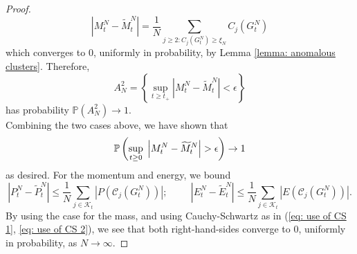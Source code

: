 \begin{proof}
\begin{equation}
          \left|M^N_t-\widetilde{M}^N_t\right|=\frac{1}{N}\sum_{j\ge 2: C_j(G^N_t)\ge \xi_N} C_j(G^N_t)
      \end{equation} which converges to $0$, uniformly in probability, by Lemma \ref{lemma: anomalous clusters}. Therefore, \begin{equation}
          A^2_N=\left\{\sup_{t\ge t_+} \left|M^N_t-\widetilde{M}^N_t\right|<\epsilon \right\}
      \end{equation} has probability $\mathbb{P}(A^2_N)\rightarrow 1$. \medskip \\ Combining the two cases above, we have shown that \begin{equation}
          \mathbb{P}\left(\sup_{t\ge 0}\hspace{0.1cm}\left|M^N_t-\widetilde{M}^N_t\right|>\epsilon\right)\rightarrow 1
      \end{equation} as desired. For the momentum and energy, we bound \begin{equation}
          \left| P^N_t-\widetilde{P}^N_t \right| \le \frac{1}{N} \sum_{j\in\mathcal{K}_t} \left|P\left(\mathcal{C}_j(G^N_t)\right)\right|;\hspace{1cm}\left| E^N_t-\widetilde{E}^N_t \right| \le \frac{1}{N} \sum_{j\in\mathcal{K}_t} \left|E\left(\mathcal{C}_j(G^N_t)\right)\right|.
      \end{equation} By using the case for the mass, and using Cauchy-Schwartz as in (\ref{eq: use of CS 1}, \ref{eq: use of CS 2}), we see that both right-hand-sides converge to $0$, uniformly in probability, as $N\rightarrow \infty.$ \end{proof}
   
   
  